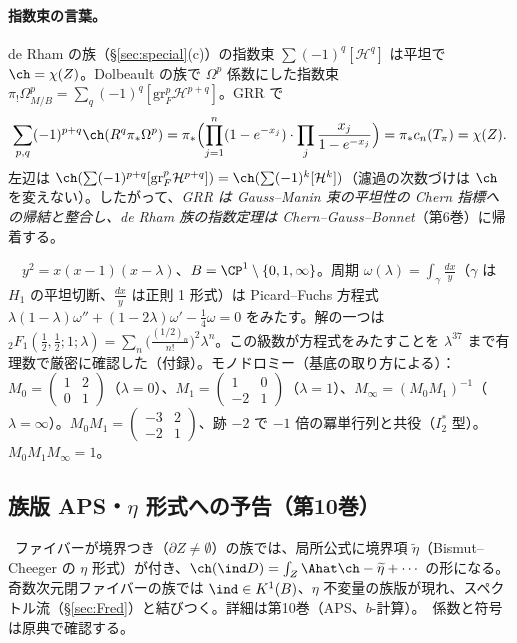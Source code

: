 \paragraph{指数束の言葉。}de Rham の族（\S\ref{sec:special}(c)）の指数束 $\sum(-1)^q[\mathcal H^q]$ は平坦で $\ch=\chi(Z)$。Dolbeault の族で $\Omega^p$ 係数にした指数束 $\pi_!\Omega^p_{M/B}=\sum_q(-1)^q[\mathrm{gr}^p_F\mathcal H^{p+q}]$。GRR で
\[
\sum_{p,q}(-1)^{p+q}\ch(R^q\pi_*\Omega^p)=\pi_*\Bigl(\prod_{j=1}^n(1-e^{-x_j})\cdot\prod_j\frac{x_j}{1-e^{-x_j}}\Bigr)=\pi_*c_n(T_\pi)=\chi(Z).
\]
左辺は $\ch(\sum(-1)^{p+q}[\mathrm{gr}^p_F\mathcal H^{p+q}])=\ch(\sum(-1)^k[\mathcal H^k])$（濾過の次数づけは $\ch$ を変えない）。したがって、\emph{GRR は Gauss--Manin 束の平坦性の Chern 指標への帰結と整合し、de Rham 族の指数定理は Chern--Gauss--Bonnet}（第6巻）に帰着する。
\begin{ex}[Legendre 族]\label{ex:Legendre}\tP\ \tC\
$y^2=x(x-1)(x-\lambda)$、$B=\CP^1\setminus\{0,1,\infty\}$。周期 $\omega(\lambda)=\int_\gamma\frac{dx}y$（$\gamma$ は $H_1$ の平坦切断、$\frac{dx}y$ は正則 1 形式）は Picard--Fuchs 方程式 $\lambda(1-\lambda)\omega''+(1-2\lambda)\omega'-\frac14\omega=0$ をみたす。解の一つは $_2F_1(\frac12,\frac12;1;\lambda)=\sum_n\bigl(\frac{(1/2)_n}{n!}\bigr)^2\lambda^n$。この級数が方程式をみたすことを $\lambda^{37}$ まで有理数で厳密に確認した（付録）。モノドロミー（基底の取り方による）：$M_0=\begin{pmatrix}1&2\\0&1\end{pmatrix}$（$\lambda=0$）、$M_1=\begin{pmatrix}1&0\\-2&1\end{pmatrix}$（$\lambda=1$）、$M_\infty=(M_0M_1)^{-1}$（$\lambda=\infty$）。$M_0M_1=\begin{pmatrix}-3&2\\-2&1\end{pmatrix}$、跡 $-2$ で $-1$ 倍の冪単行列と共役（$I_2^*$ 型）。$M_0M_1M_\infty=1$。
\end{ex}

\subsection{族版 APS・$\eta$ 形式への予告（第10巻）}
\tC\ ファイバーが境界つき（$\partial Z\ne\emptyset$）の族では、局所公式に境界項 $\widetilde\eta$（Bismut--Cheeger の $\eta$ 形式）が付き、$\ch(\ind D)=\int_Z\Ahat\ch-\widetilde\eta+\cdots$ の形になる。奇数次元閉ファイバーの族では $\ind\in K^1(B)$、$\eta$ 不変量の族版が現れ、スペクトル流（\S\ref{sec:Fred}）と結びつく。詳細は第10巻（APS、$b$-計算）。\tQ\ 係数と符号は原典で確認する。

